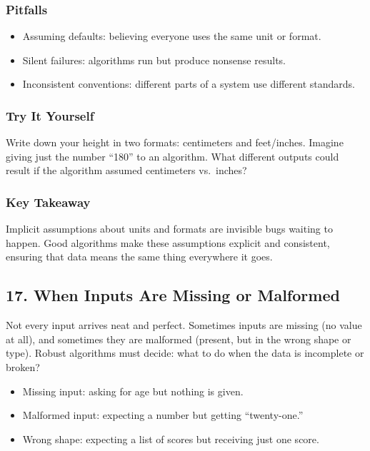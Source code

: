 \documentclass[
  letterpaper,
  DIV=11,
  numbers=noendperiod]{scrreprt}
\providecommand{\tightlist}{%
  \setlength{\itemsep}{0pt}\setlength{\parskip}{0pt}}
\begin{document}
\subsubsection{Pitfalls}\label{pitfalls-12}

\begin{itemize}
\tightlist
\item
  Assuming defaults: believing everyone uses the same unit or format.
\item
  Silent failures: algorithms run but produce nonsense results.
\item
  Inconsistent conventions: different parts of a system use different
  standards.
\end{itemize}

\subsubsection{Try It Yourself}\label{try-it-yourself-15}

Write down your height in two formats: centimeters and feet/inches.
Imagine giving just the number ``180'' to an algorithm. What different
outputs could result if the algorithm assumed centimeters vs.~inches?

\subsubsection{Key Takeaway}\label{key-takeaway-14}

Implicit assumptions about units and formats are invisible bugs waiting
to happen. Good algorithms make these assumptions explicit and
consistent, ensuring that data means the same thing everywhere it goes.

\subsection{17. When Inputs Are Missing or
Malformed}\label{when-inputs-are-missing-or-malformed}

Not every input arrives neat and perfect. Sometimes inputs are missing
(no value at all), and sometimes they are malformed (present, but in the
wrong shape or type). Robust algorithms must decide: what to do when the
data is incomplete or broken?

\begin{itemize}
\tightlist
\item
  Missing input: asking for age but nothing is given.
\item
  Malformed input: expecting a number but getting ``twenty-one.''
\item
  Wrong shape: expecting a list of scores but receiving just one score.
\end{itemize}
\end{document}
